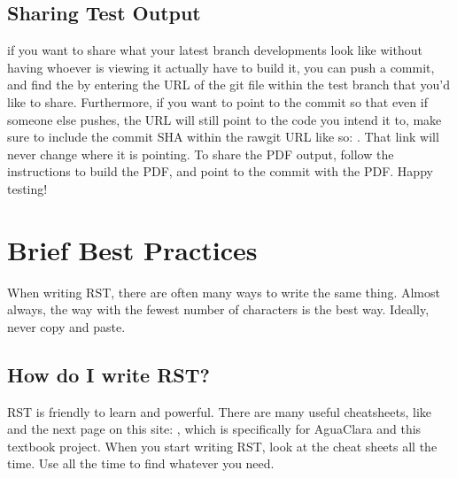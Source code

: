 \documentclass[letterpaper,10pt,english]{sphinxmanual}
\begin{document}
\subsection{Sharing Test Output}
\label{\detokenize{Textbook_Creation_Help/rst_intro:sharing-test-output}}
if you want to share what your latest branch developments look like without having whoever is viewing it actually have to build it, you can push a commit, and find the  by entering the URL of the git file within the test branch that you’d like to share. Furthermore, if you want to point to the commit so that even if someone else pushes, the URL will still point to the code you intend it to, make sure to include the commit SHA within the rawgit URL like so: . That link will never change where it is pointing. To share the PDF output, follow the {\hyperref[\detokenize{Textbook_Creation_Help/rst_intro:heading-testing-online}]{}} instructions to build the PDF, and point to the commit with the PDF. Happy testing!


\section{Brief Best Practices}
\label{\detokenize{Textbook_Creation_Help/rst_intro:brief-best-practices}}\label{\detokenize{Textbook_Creation_Help/rst_intro:heading-brief-best-practices}}
When writing RST, there are often many ways to write the same thing. Almost always, the way with the fewest number of characters is the best way. Ideally, never copy and paste.


\subsection{How do I write RST?}
\label{\detokenize{Textbook_Creation_Help/rst_intro:how-do-i-write-rst}}\label{\detokenize{Textbook_Creation_Help/rst_intro:heading-how-do-i-write-rst}}
RST is friendly to learn and powerful. There are many useful cheatsheets, like  and the next page on this site: , which is specifically for AguaClara and this textbook project. When you start writing RST, look at the cheat sheets all the time. Use  all the time to find whatever you need.
\end{document}

